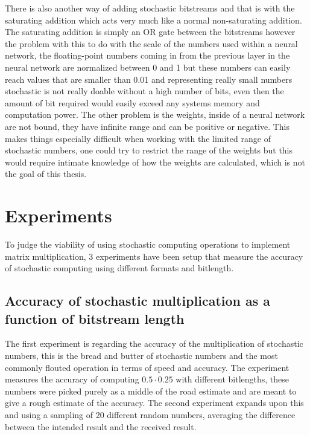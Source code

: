 \documentclass[a4paper,oneside,phd,etd]{BYUPhys}
\begin{document}
There is also another way of adding stochastic bitstreams and that is with the saturating addition which acts very much like a normal non-saturating addition. The saturating addition is simply an OR gate between the bitstreams  however the problem with this to do with the scale of the numbers used within a neural network, the floating-point numbers coming in from the previous layer in the neural network are normalized between 0 and 1 but these numbers can easily reach values that are smaller than 0.01 and representing really small numbers stochastic is not really doable without a high number of bits, even then the amount of bit required would easily exceed any systems memory and computation power. 
The other problem is the weights, inside of a neural network are not bound, they have infinite range and can be positive or negative. This makes things especially difficult when working with the limited range of stochastic numbers, one could try to restrict the range of the weights but this would require intimate knowledge of how the weights are calculated, which is not the goal of this thesis.


\section{Experiments}
To judge the viability of using stochastic computing operations to implement matrix multiplication, 3 experiments have been setup that measure the accuracy of stochastic computing using different formats and bitlength.

\subsection{Accuracy of stochastic multiplication as a function of bitstream length}
The first experiment is regarding the accuracy of the multiplication of stochastic numbers, this is the bread and butter of stochastic numbers and the most commonly flouted operation in terms of speed and accuracy.
The experiment measures the accuracy of computing $0.5\cdot 0.25$ with different bitlengths, these numbers were picked purely as a middle of the road estimate and are meant to give a rough estimate of the accuracy.
The second experiment expands upon this and using a sampling of 20 different random numbers, averaging the difference between the intended result and the received result.
\end{document}
